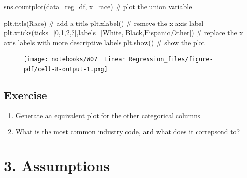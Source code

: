 \documentclass[
  letterpaper,
  DIV=11,
  numbers=noendperiod]{scrreprt}
\newenvironment{Shaded}{\begin{snugshade}}{\end{snugshade}}
\newcommand{\CommentTok}[1]{\textcolor[rgb]{0.37,0.37,0.37}{#1}}
\newcommand{\DecValTok}[1]{\textcolor[rgb]{0.68,0.00,0.00}{#1}}
\newcommand{\NormalTok}[1]{\textcolor[rgb]{0.00,0.23,0.31}{#1}}
\newcommand{\OperatorTok}[1]{\textcolor[rgb]{0.37,0.37,0.37}{#1}}
\newcommand{\StringTok}[1]{\textcolor[rgb]{0.13,0.47,0.30}{#1}}
\providecommand{\tightlist}{%
  \setlength{\itemsep}{0pt}\setlength{\parskip}{0pt}}\usepackage{longtable,booktabs,array}
\begin{document}
\begin{Shaded}
\begin{Highlighting}[]
\NormalTok{sns.countplot(data}\OperatorTok{=}\NormalTok{reg\_df, x}\OperatorTok{=}\StringTok{\textquotesingle{}race\textquotesingle{}}\NormalTok{) }\CommentTok{\# plot the union variable}

\NormalTok{plt.title(}\StringTok{\textquotesingle{}Race\textquotesingle{}}\NormalTok{) }\CommentTok{\# add a title}
\NormalTok{plt.xlabel(}\StringTok{\textquotesingle{}\textquotesingle{}}\NormalTok{) }\CommentTok{\# remove the x axis label}
\NormalTok{plt.xticks(ticks}\OperatorTok{=}\NormalTok{[}\DecValTok{0}\NormalTok{,}\DecValTok{1}\NormalTok{,}\DecValTok{2}\NormalTok{,}\DecValTok{3}\NormalTok{],labels}\OperatorTok{=}\NormalTok{[}\StringTok{\textquotesingle{}White\textquotesingle{}}\NormalTok{, }\StringTok{\textquotesingle{}Black\textquotesingle{}}\NormalTok{,}\StringTok{\textquotesingle{}Hispanic\textquotesingle{}}\NormalTok{,}\StringTok{\textquotesingle{}Other\textquotesingle{}}\NormalTok{]) }\CommentTok{\# replace the x axis labels with more descriptive labels}
\NormalTok{plt.show() }\CommentTok{\# show the plot}
\end{Highlighting}
\end{Shaded}

\begin{figure}[H]

{\centering \texttt{[image: notebooks/W07. Linear Regression\_files/figure-pdf/cell-8-output-1.png]}

}

\end{figure}

\hypertarget{exercise-22}{%
\subsection{Exercise}\label{exercise-22}}

\begin{enumerate}
\def\labelenumi{\arabic{enumi}.}
\tightlist
\item
  Generate an equivalent plot for the other categorical columns
\item
  What is the most common industry code, and what does it correpsond to?
\end{enumerate}

\hypertarget{assumptions}{%
\section{3. Assumptions}\label{assumptions}}
\end{document}
